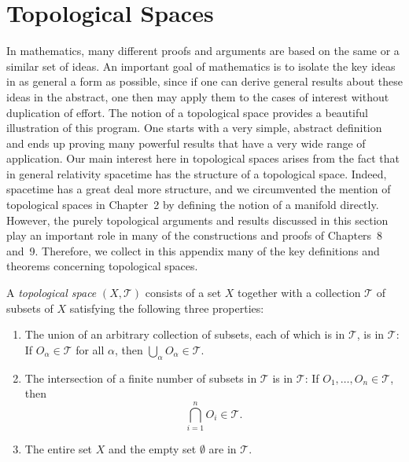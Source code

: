 
\section{Topological Spaces}

In mathematics, many different proofs and arguments are based on the same or a
similar set of ideas. An important goal of mathematics is to isolate the key ideas in
as general a form as possible, since if one can derive general results about these ideas
in the abstract, one then may apply them to the cases of interest without duplication
of effort. The notion of a topological space provides a beautiful illustration of this
program. One starts with a very simple, abstract definition and ends up proving many
powerful results that have a very wide range of application. Our main interest here
in topological spaces arises from the fact that in general relativity spacetime has the
structure of a topological space. Indeed, spacetime has a great deal more structure,
and we circumvented the mention of topological spaces in Chapter~2 by defining the
notion of a manifold directly. However, the purely topological arguments and results
discussed in this section play an important role in many of the constructions and
proofs of Chapters~8 and~9. Therefore, we collect in this appendix many of the key
definitions and theorems concerning topological spaces.

A \emph{topological space} \((X,\mathcal T)\) consists of a set \(X\) together with a
collection \(\mathcal T\) of subsets of \(X\) satisfying the following three properties:

\begin{enumerate}[label=\textup{(\arabic*)},leftmargin=2.2em]
\item
The union of an arbitrary collection of subsets, each of which is in \(\mathcal T\), is
in \(\mathcal T\): If \(O_\alpha\in\mathcal T\) for all \(\alpha\), then
\(\bigcup_\alpha O_\alpha\in\mathcal T\).

\item
The intersection of a finite number of subsets in \(\mathcal T\) is in \(\mathcal T\):
If \(O_1,\ldots,O_n\in\mathcal T\), then
\[
  \bigcap_{i=1}^{n}O_i\in\mathcal T.
\]

\item
The entire set \(X\) and the empty set \(\emptyset\) are in \(\mathcal T\).
\end{enumerate}

